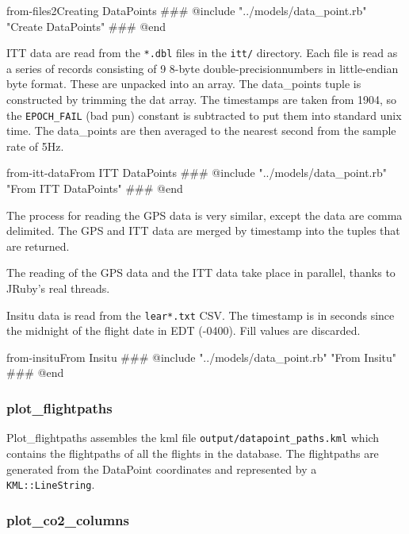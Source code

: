 \documentclass[12pt]{article}
\begin{document}
\begin{code}{from-files2}{Creating DataPoints}
### @include "../models/data_point.rb" "Create DataPoints"
### @end
\end{code}

ITT data are read from the \texttt{*.dbl} files in the \texttt{itt/} directory.  Each file is read as a series of records consisting of 9 8-byte double-precisionnumbers in little-endian byte format.  These are unpacked into an array.  The data\_points tuple is constructed by trimming the dat array.  The timestamps are taken from 1904, so the \texttt{EPOCH\_FAIL} (bad pun) constant is subtracted to put them into standard unix time.  The data\_points are then averaged to the nearest second from the sample rate of 5Hz.

\begin{code}{from-itt-data}{From ITT DataPoints}
### @include "../models/data_point.rb" "From ITT DataPoints"
### @end
\end{code}

The process for reading the GPS data is very similar, except the data are comma delimited.  The GPS and ITT data are merged by timestamp into the tuples that are returned.

The reading of the GPS data and the ITT data take place in parallel, thanks to JRuby's real threads.


Insitu data is read from the \texttt{lear*.txt} CSV.  The timestamp is in seconds since the midnight of the flight date in EDT (-0400).  Fill values are discarded.

\begin{code}{from-insitu}{From Insitu}
### @include "../models/data_point.rb" "From Insitu"
### @end
\end{code}

\subsubsection*{plot\_flightpaths}

Plot\_flightpaths assembles the kml file \texttt{output/datapoint\_paths.kml} which contains the flightpaths of all the flights in the database.  The flightpaths are generated from the DataPoint coordinates and represented by a \texttt{KML::LineString}.

\subsubsection*{plot\_co2\_columns}
\end{document}
